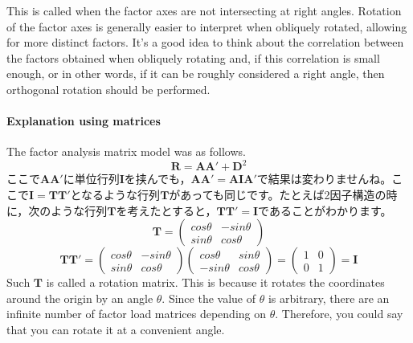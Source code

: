 \documentclass{ltjsbook}
\begin{document}
This is called  when the factor axes are not intersecting at right angles. Rotation of the factor axes is generally easier to interpret when obliquely rotated, allowing for more distinct factors. It's a good idea to think about the correlation between the factors obtained when obliquely rotating and, if this correlation is small enough, or in other words, if it can be roughly considered a right angle, then orthogonal rotation should be performed.

\paragraph{Explanation using matrices}
The factor analysis matrix model was as follows.
\[ \bm{R}= \bm{AA'}+\bm{D}^2 \]
ここで$\bm{AA'}$に単位行列$\bm{I}$を挟んでも，$\bm{AA'}=\bm{AIA'}$で結果は変わりませんね。ここで$\bm{I} = \bm{TT'}$となるような行列$\bm{T}$があっても同じです。たとえば2因子構造の時に，次のような行列$\bm{T}$を考えたとすると，$\bm{TT'}=\bm{I}$であることがわかります。
\[
	\bm{T} = \begin{pmatrix} cos \theta & -sin \theta \\ sin \theta & cos\theta \end{pmatrix}
\]
\[
	\bm{TT'}=\begin{pmatrix} cos \theta & -sin \theta \\ sin \theta & cos\theta \end{pmatrix}
	\begin{pmatrix} cos \theta & sin \theta \\ -sin \theta & cos\theta \end{pmatrix}
	=\begin{pmatrix} 1 & 0 \\ 0 & 1 \end{pmatrix} =\bm{I}
\]
Such $\bm{T}$ is called a rotation matrix. This is because it rotates the coordinates around the origin by an angle $\theta$. Since the value of $\theta$ is arbitrary, there are an infinite number of factor load matrices depending on $\theta$. Therefore, you could say that you can rotate it at a convenient angle.
\end{document}
